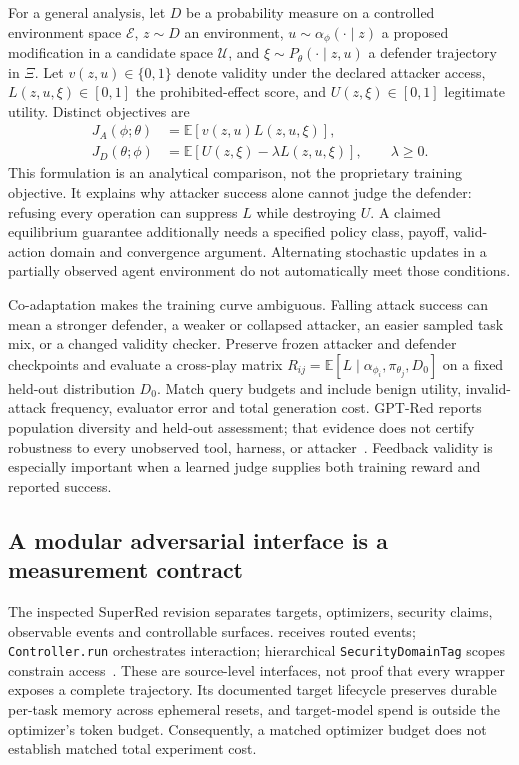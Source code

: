 For a general analysis, let $D$ be a probability measure on a controlled environment space $\mathcal E$, $z\sim D$ an environment, $u\sim\alpha_\phi(\cdot\mid z)$ a proposed modification in a candidate space $\mathcal U$, and $\xi\sim P_{\theta}(\cdot\mid z,u)$ a defender trajectory in $\Xi$. Let $v(z,u)\in\{0,1\}$ denote validity under the declared attacker access, $L(z,u,\xi)\in[0,1]$ the prohibited-effect score, and $U(z,\xi)\in[0,1]$ legitimate utility. Distinct objectives are
\begin{align}
 J_A(\phi;\theta)&=\mathbb E[v(z,u)L(z,u,\xi)],\\
 J_D(\theta;\phi)&=\mathbb E[U(z,\xi)-\lambda L(z,u,\xi)],
 \qquad\lambda\geq0.
\end{align}
This formulation is an analytical comparison, not the proprietary training objective. It explains why attacker success alone cannot judge the defender: refusing every operation can suppress $L$ while destroying $U$. A claimed equilibrium guarantee additionally needs a specified policy class, payoff, valid-action domain and convergence argument. Alternating stochastic updates in a partially observed agent environment do not automatically meet those conditions.

Co-adaptation makes the training curve ambiguous. Falling attack success can mean a stronger defender, a weaker or collapsed attacker, an easier sampled task mix, or a changed validity checker. Preserve frozen attacker and defender checkpoints and evaluate a cross-play matrix $R_{ij}=\mathbb E[L\mid\alpha_{\phi_i},\pi_{\theta_j},D_0]$ on a fixed held-out distribution $D_0$. Match query budgets and include benign utility, invalid-attack frequency, evaluator error and total generation cost. GPT-Red reports population diversity and held-out assessment; that evidence does not certify robustness to every unobserved tool, harness, or attacker~\cite{wallace2026gptred}. Feedback validity is especially important when a learned judge supplies both training reward and reported success.

\subsection{A modular adversarial interface is a measurement contract}\label{sec:C28:superred}
The inspected SuperRed revision separates targets, optimizers, security claims, observable events and controllable surfaces.  receives routed events; \texttt{Controller.run} orchestrates interaction; hierarchical \texttt{SecurityDomainTag} scopes constrain access~\cite{superred2026}. These are source-level interfaces, not proof that every wrapper exposes a complete trajectory. Its documented target lifecycle preserves durable per-task memory across ephemeral resets, and target-model spend is outside the optimizer's token budget. Consequently, a matched optimizer budget does not establish matched total experiment cost.

